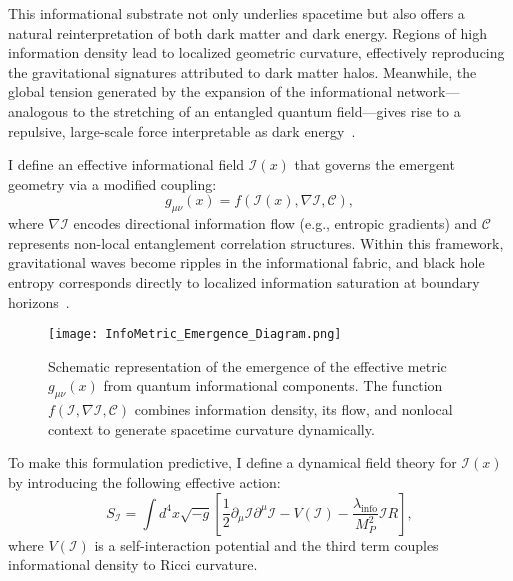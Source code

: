 \documentclass[twocolumn,superscriptaddress,floatfix]{revtex4-2}
\begin{document}
This informational substrate not only underlies spacetime but also offers a natural reinterpretation of both dark matter and dark energy. Regions of high information density lead to localized geometric curvature, effectively reproducing the gravitational signatures attributed to dark matter halos. Meanwhile, the global tension generated by the expansion of the informational network—analogous to the stretching of an entangled quantum field—gives rise to a repulsive, large-scale force interpretable as dark energy~\cite{Verlinde2016, Hossenfelder2017}.

I define an effective informational field \(\mathcal{I}(x)\) that governs the emergent geometry via a modified coupling:
\begin{equation}
g_{\mu\nu}(x) = f(\mathcal{I}(x), \nabla \mathcal{I}, \mathcal{C}),
\label{eq:infometric}
\end{equation}
where \(\nabla \mathcal{I}\) encodes directional information flow (e.g., entropic gradients) and \(\mathcal{C}\) represents non-local entanglement correlation structures. Within this framework, gravitational waves become ripples in the informational fabric, and black hole entropy corresponds directly to localized information saturation at boundary horizons~\cite{Bekenstein1973, RyuTakayanagi2006}.

\begin{figure}[htbp]
    \centering
    \texttt{[image: InfoMetric\_Emergence\_Diagram.png]}
    \caption{Schematic representation of the emergence of the effective metric \(g_{\mu\nu}(x)\) from quantum informational components. The function \(f(\mathcal{I}, \nabla \mathcal{I}, \mathcal{C})\) combines information density, its flow, and nonlocal context to generate spacetime curvature dynamically.}
    \label{fig:info-metric-emergence}
\end{figure}

To make this formulation predictive, I define a dynamical field theory for \(\mathcal{I}(x)\) by introducing the following effective action:
\begin{equation}
S_\mathcal{I} = \int d^4x \sqrt{-g} \left[ \frac{1}{2} \partial_\mu \mathcal{I} \partial^\mu \mathcal{I} - V(\mathcal{I}) - \frac{\lambda_{\text{info}}}{M_P^2} \mathcal{I} R \right],
\label{eq:info-action}
\end{equation}
where \(V(\mathcal{I})\) is a self-interaction potential and the third term couples informational density to Ricci curvature. 
\end{document}
